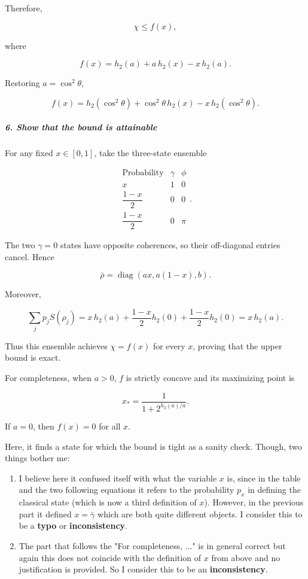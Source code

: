 Therefore,

\[
\chi\leq f(x),
\]

where

\[
f(x)=h_2(a)+a\,h_2(x)-x\,h_2(a).
\]

Restoring $a=\cos^2\theta$,

\[
{ f(x) = h_2(\cos^2\theta) +\cos^2\theta\,h_2(x) -x\,h_2(\cos^2\theta) }.
\]

\subparagraph*{6. Show that the bound is attainable}

For any fixed $x\in[0,1]$, take the three-state ensemble

\[
\begin{array}{c|c|c}
\text{Probability}&\gamma&\phi\\ \hline
x&1&0\\
\dfrac{1-x}{2}&0&0\\
\dfrac{1-x}{2}&0&\pi
\end{array}.
\]

The two $\gamma=0$ states have opposite coherences, so their off-diagonal entries cancel. Hence

\[
\bar\rho = \operatorname{diag}\left(ax,a(1-x),b\right).
\]

Moreover,

\[
\sum_jp_jS(\rho_j) = x\,h_2(a) +\frac{1-x}{2}h_2(0) +\frac{1-x}{2}h_2(0) = x\,h_2(a).
\]

Thus this ensemble achieves $\chi=f(x)$ for every $x$, proving that the upper bound is exact.

For completeness, when $a>0$, $f$ is strictly concave and its maximizing point is

\[
x_*= \frac{1}{1+2^{h_2(a)/a}}.
\]

If $a=0$, then $f(x)=0$ for all $x$.

{
\color{blue}
Here, it finds a state for which the bound is tight as a sanity check. Though, two things bother me: 
\begin{enumerate}
  \item I believe here it confused itself with what the variable $x$ is, since in the table and the two following equations it refers to the probability $p_x$ in defining the classical state (which is now a third definition of $x$). However, in the previous part it defined $x=\bar\gamma$ which are both quite different objects. I consider this to be a \textbf{typo} or \textbf{inconsistency}.
  
  \item The part that follows the "For completeness, ..." is in general correct but again this does not coincide with the definition of $x$ from above and no justification is provided. So I consider this to be an \textbf{inconsistency}.
\end{enumerate} 
}